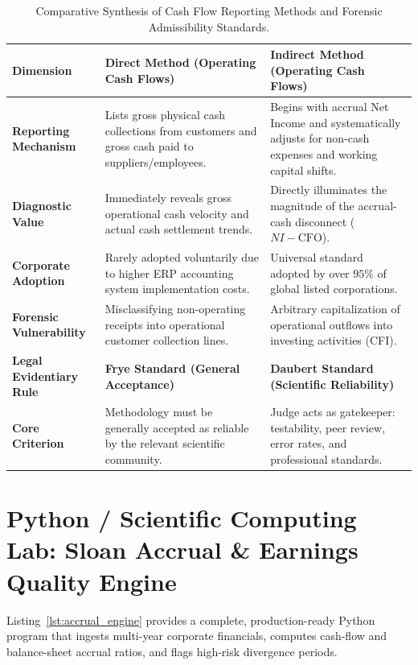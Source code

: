 \begin{table}[htbp]
\centering
\small
\begin{tabularx}{\textwidth}{lXX}
\toprule
\textbf{Dimension} & \textbf{Direct Method (Operating Cash Flows)} & \textbf{Indirect Method (Operating Cash Flows)} \\
\midrule
\textbf{Reporting Mechanism} & Lists gross physical cash collections from customers and gross cash paid to suppliers/employees. & Begins with accrual Net Income and systematically adjusts for non-cash expenses and working capital shifts. \\
\addlinespace
\textbf{Diagnostic Value} & Immediately reveals gross operational cash velocity and actual cash settlement trends. & Directly illuminates the magnitude of the accrual-cash disconnect ($NI - \text{CFO}$). \\
\addlinespace
\textbf{Corporate Adoption} & Rarely adopted voluntarily due to higher ERP accounting system implementation costs. & Universal standard adopted by over $95\%$ of global listed corporations. \\
\addlinespace
\textbf{Forensic Vulnerability} & Misclassifying non-operating receipts into operational customer collection lines. & Arbitrary capitalization of operational outflows into investing activities (CFI). \\
\midrule
\textbf{Legal Evidentiary Rule} & \textbf{Frye Standard (General Acceptance)} & \textbf{Daubert Standard (Scientific Reliability)} \\
\midrule
\textbf{Core Criterion} & Methodology must be generally accepted as reliable by the relevant scientific community. & Judge acts as gatekeeper: testability, peer review, error rates, and professional standards. \\
\bottomrule
\end{tabularx}
\caption{Comparative Synthesis of Cash Flow Reporting Methods and Forensic Admissibility Standards.}
\label{tab:comparison_cfo_methods}
\end{table}

\section{Python / Scientific Computing Lab: Sloan Accrual \& Earnings Quality Engine}

Listing~\ref{lst:accrual_engine} provides a complete, production-ready Python program that ingests multi-year corporate financials, computes cash-flow and balance-sheet accrual ratios, and flags high-risk divergence periods.

